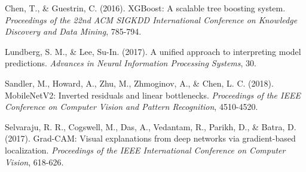 Chen, T., \& Guestrin, C. (2016). XGBoost: A scalable tree boosting
system. \emph{Proceedings of the 22nd ACM SIGKDD International
Conference on Knowledge Discovery and Data Mining}, 785-794.

Lundberg, S. M., \& Lee, Su-In. (2017). A unified approach to
interpreting model predictions. \emph{Advances in Neural Information
Processing Systems}, 30.

Sandler, M., Howard, A., Zhu, M., Zhmoginov, A., \& Chen, L. C. (2018).
MobileNetV2: Inverted residuals and linear bottlenecks.
\emph{Proceedings of the IEEE Conference on Computer Vision and Pattern
Recognition}, 4510-4520.

Selvaraju, R. R., Cogswell, M., Das, A., Vedantam, R., Parikh, D., \&
Batra, D. (2017). Grad-CAM: Visual explanations from deep networks via
gradient-based localization. \emph{Proceedings of the IEEE International
Conference on Computer Vision}, 618-626.
